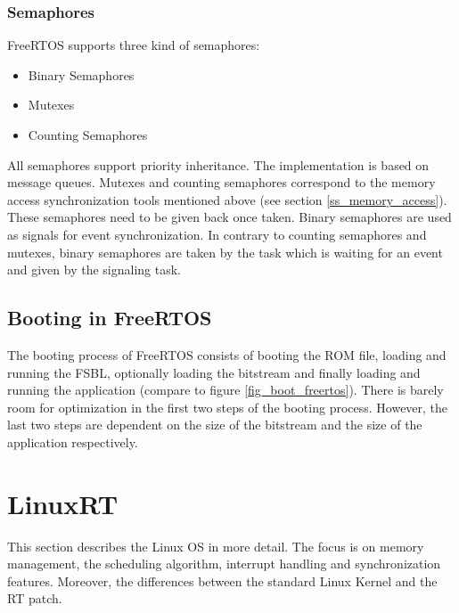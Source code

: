 \subsubsection{Semaphores}
FreeRTOS supports three kind of semaphores:
\begin{itemize}
	\item Binary Semaphores
	\item Mutexes
	\item Counting Semaphores
\end{itemize}
All semaphores support priority inheritance.
The implementation is based on message queues.
Mutexes and counting semaphores correspond to the memory access synchronization tools mentioned above (see section \ref{ss_memory_access}). 
These semaphores need to be given back once taken.
Binary semaphores are used as signals for event synchronization.
In contrary to counting semaphores and mutexes, binary semaphores are taken by the task which is waiting for an event and given by the signaling task. 

\subsection{Booting in FreeRTOS}\label{ss_booting_in_freertos}
The booting process of FreeRTOS consists of booting the \ac{ROM} file, loading and running the \ac{FSBL}, optionally loading the bitstream and finally loading and running the application (compare to figure \ref{fig_boot_freertos}).
There is barely room for optimization in the first two steps of the booting process. 
However, the last two steps are dependent on the size of the bitstream and the size of the application respectively.

\section{LinuxRT}
This section describes the Linux \ac{OS} in more detail.
The focus is on memory management, the scheduling algorithm, interrupt handling and synchronization features.
Moreover, the differences between the standard Linux Kernel and the RT patch.

